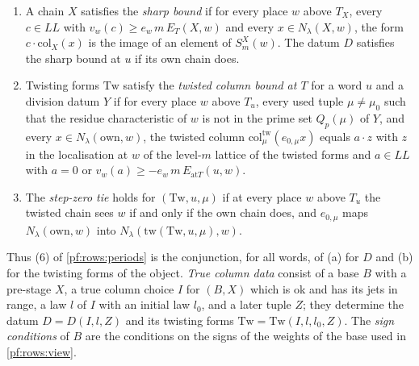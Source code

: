 \begin{definition}\label{pf:rows:defsharp}
\begin{enumerate}[label=(\alph*)]
\item A chain $X$ satisfies the \emph{sharp bound} if for every place $w$ above $T_X$, every $c\in\mathit{LL}$ with
$v_w(c)\ge e_w\,m\,E_T(X,w)$ and every $x\in N_\lambda(X,w)$, the form $c\cdot\mathrm{col}_X(x)$ is the image of an element of
$S^X_m(w)$. The datum $D$ satisfies the sharp bound at $u$ if its own chain does.
\item Twisting forms $\mathrm{Tw}$ satisfy the \emph{twisted column bound at $T$} for a word $u$ and a division datum $Y$ if for
every place $w$ above $T_u$, every used tuple $\mu\ne\mu_0$ such that the residue characteristic of $w$ is not in the prime set
$Q_p(\mu)$ of $Y$, and every $x\in N_\lambda(\mathrm{own},w)$, the twisted column $\mathrm{col}^{\mathrm{tw}}_\mu(e_{0,\mu}x)$
equals $a\cdot z$ with $z$ in the localisation at $w$ of the level-$m$ lattice of the twisted forms and $a\in\mathit{LL}$ with
$a=0$ or $v_w(a)\ge-e_w\,m\,E_{\mathrm{at}T}(u,w)$.
\item The \emph{step-zero tie} holds for $(\mathrm{Tw},u,\mu)$ if at every place $w$ above $T_u$ the twisted chain sees $w$ if and
only if the own chain does, and $e_{0,\mu}$ maps $N_\lambda(\mathrm{own},w)$ into $N_\lambda(\mathrm{tw}(\mathrm{Tw},u,\mu),w)$.
\end{enumerate}
\end{definition}

Thus (6) of \cref{pf:rows:periods} is the conjunction, for all words, of (a) for $D$ and (b) for the twisting forms of the
object. \emph{True column data} consist of a base $B$ with a pre-stage $X$, a true column choice $I$ for $(B,X)$ which is ok
and has its jets in range, a law $l$ of $I$ with an initial law $l_0$, and a later tuple $Z$; they determine the datum
$D=D(I,l,Z)$ and its twisting forms $\mathrm{Tw}=\mathrm{Tw}(I,l,l_0,Z)$. The \emph{sign conditions} of $B$ are the conditions on
the signs of the weights of the base used in \cref{pf:rows:view}.

